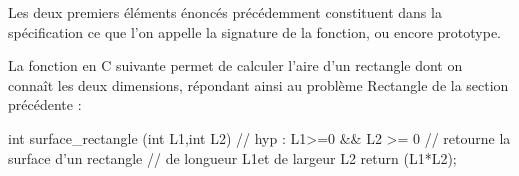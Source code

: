 		\begin{Remarque}
			Les deux premiers éléments énoncés précédemment constituent dans la spécification ce que l'on appelle la signature de la fonction, ou encore prototype.
		\end{Remarque}
		
		\begin{Exemple}
			La fonction en C suivante permet de calculer l'aire d'un rectangle dont on connaît les deux dimensions, répondant ainsi au problème \textsf{Rectangle} de la section précédente :
			\begin{C}
					int surface_rectangle (int L1,int L2){
						// hyp : L1>=0 && L2 >= 0
						// retourne la surface d'un rectangle
						// de longueur L1et de largeur L2
						return (L1*L2);
					}
			\end{C}
		\end{Exemple}
	
